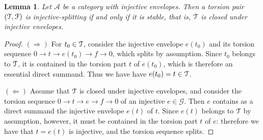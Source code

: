 \documentclass[a4paper,11pt]{amsart}
\theoremstyle{plain}
\newtheorem{lemma}[thm]{Lemma}
\theoremstyle{definition}
\newcommand{\Acal}{\mathcal{A}} \newcommand{\Bcal}{\mathcal{B}} \newcommand{\Ccal}{\mathcal{C}}
\newcommand{\Gcal}{\mathcal{G}} \newcommand{\Hcal}{\mathcal{H}} \newcommand{\Ical}{\mathcal{I}}
\begin{document}
\begin{lemma}
	Let $\Acal$ be a category with injective envelopes. Then a torsion pair
	$(\mathcal{T},\mathcal{F})$ is injective-splitting if and only if it is \emph{stable},
	that is, $\mathcal{T}$ is closed under injective envelopes.
\end{lemma}

\begin{proof}
	$(\Rightarrow)$ For $t_0\in\mathcal{T}$, consider the injective envelope $e(t_0)$ and its
	torsion sequence $0\to t\to e(t_0)\to f\to 0$, which splits by assumption.
	Since $t_0$ belongs to $\mathcal{T}$, it is contained in the torsion part $t$ of
	$e(t_0)$, which is therefore an essential direct summand. Thus we have have
	$e(t_0)=t\in\mathcal{T}$.

	$(\Leftarrow)$ Assume that $\mathcal{T}$ is closed under injective envelopes, and
	consider the torsion sequence $0\to t\to e\to f\to 0$ of an injective
	$e\in\Gcal$. Then $e$ contains as a direct summand the injective envelope
	$e(t)$ of $t$. Since $e(t)$ belongs to $\mathcal{T}$ by assumption, however, it must
	be contained in the torsion part $t$ of $e$: therefore we have that $t=e(t)$
	is injective, and the torsion sequence splits.
\end{proof}
\end{document}

